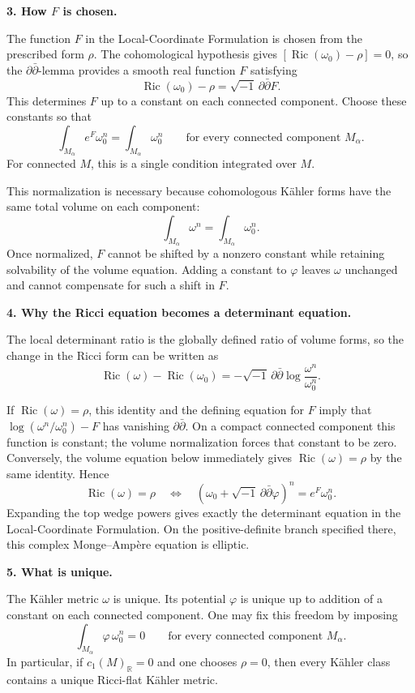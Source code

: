 \documentclass[11pt]{article}
\begin{document}
\textbf{3. How $F$ is chosen.}

The function $F$ in the Local-Coordinate Formulation is chosen
from the prescribed form $\rho$. The cohomological hypothesis gives
$[\operatorname{Ric}(\omega_0)-\rho]=0$, so the
$\partial\bar\partial$-lemma provides a smooth real function $F$
satisfying
\[
\operatorname{Ric}(\omega_0)-\rho
=\sqrt{-1}\,\partial\bar\partial F.
\]
This determines $F$ up to a constant on each connected component.
Choose these constants so that
\[
\int_{M_\alpha}e^F\omega_0^n
=\int_{M_\alpha}\omega_0^n
\qquad
\text{for every connected component }M_\alpha.
\]
For connected $M$, this is a single condition integrated over $M$.

This normalization is necessary because cohomologous K\"ahler forms
have the same total volume on each component:
\[
\int_{M_\alpha}\omega^n=\int_{M_\alpha}\omega_0^n.
\]
Once normalized, $F$ cannot be shifted by a nonzero constant
while retaining solvability of the volume equation.
Adding a constant to $\varphi$ leaves $\omega$ unchanged
and cannot compensate for such a shift in $F$.

\textbf{4. Why the Ricci equation becomes a determinant equation.}

The local determinant ratio is the globally defined ratio of volume
forms, so the change in the Ricci form can be written as
\[
\operatorname{Ric}(\omega)-\operatorname{Ric}(\omega_0)
=-\sqrt{-1}\,\partial\bar\partial
\log\frac{\omega^n}{\omega_0^n}.
\]

If $\operatorname{Ric}(\omega)=\rho$, this identity and the defining
equation for $F$ imply that
$\log(\omega^n/\omega_0^n)-F$ has vanishing
$\partial\bar\partial$. On a compact connected component this
function is constant; the volume normalization forces that constant
to be zero. Conversely, the volume equation below immediately gives
$\operatorname{Ric}(\omega)=\rho$ by the same identity. Hence
\[
\operatorname{Ric}(\omega)=\rho
\quad\Longleftrightarrow\quad
\left(
\omega_0+\sqrt{-1}\,\partial\bar\partial\varphi
\right)^n
=e^F\omega_0^n.
\]
Expanding the top wedge powers gives exactly the determinant equation
in the Local-Coordinate Formulation. On the positive-definite branch
specified there, this complex Monge--Amp\`ere equation is elliptic.

\textbf{5. What is unique.}\par\nopagebreak

The K\"ahler metric $\omega$ is unique. Its potential $\varphi$
is unique up to addition of a constant on each connected component.
One may fix this freedom by imposing
\[
\int_{M_\alpha}\varphi\,\omega_0^n=0
\qquad
\text{for every connected component }M_\alpha.
\]
In particular, if $c_1(M)_{\mathbb R}=0$ and one chooses $\rho=0$,
then every K\"ahler class contains a unique Ricci-flat K\"ahler metric.
\end{document}
